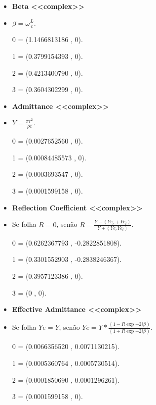 \documentclass[10pt]{beamer}
\theoremstyle{remark}
\theoremstyle{definition}
\begin{document}
\begin{frame}[allowframebreaks]
\begin{itemize}
		\end{itemize}
		
		\framebreak
		
		\begin{itemize}
		\item \textbf{Beta <<complex>>}
		\item $ \beta = \omega \frac{L}{c}$.
		\item [0] = (1.1466813186  ,  0).
		\item [1] = (0.3799154393  ,  0).
		\item [2] = (0.4213400790  ,  0).
		\item [3] = (0.3604302299  ,  0).
		
		\end{itemize}
		
		\framebreak
		
		\begin{itemize}
		\item \textbf{Admittance <<complex>>}
		\item $ Y = \frac{\pi r^2}{\rho c}$.
		\item [0] = (0.0027652560  ,  0).
		\item [1] = (0.00084485573 ,  0).
		\item [2] = (0.0003693547  ,  0).
		\item [3] = (0.0001599158  ,  0).
		
		\end{itemize}
		
		\framebreak
		
		\begin{itemize}
		\item \textbf{Reflection Coefficient <<complex>>}
		\item Se folha $ R = 0 $, senão $ R = \frac{Y - (Ye_r + Ye_l)}{Y + (Ye_r Ye_l)}$.
		\item [0] = (0.6262367793  ,  -0.2822851808).
		\item [1] = (0.3301552903  ,  -0.2838246367).
		\item [2] = (0.3957123386  ,  0).
		\item [3] = (0             ,  0).
		
		\end{itemize}
		
		\framebreak

	\begin{itemize}
		\item \textbf{Effective Admittance <<complex>>}
		\item Se folha $ Ye = Y $, senão $ Ye = Y * \frac{(1 - R\exp{-2i\beta})}{(1 + R\exp{-2i\beta})}$.
		\item [0] = (0.0066356520  ,  0.0071130215).
		\item [1] = (0.0005360764  ,  0.0005730514).
		\item [2] = (0.0001850690  ,  0.0001296261).
		\item [3] = (0.0001599158  ,  0).
	

\end{itemize}
\end{frame}
\end{document}
